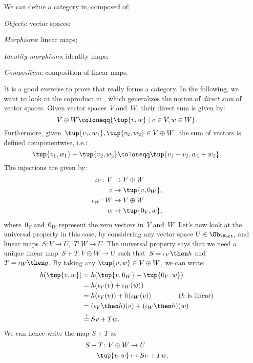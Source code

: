 \begin{example}
We can define a category \Vect in, composed of: 
\begin{compactitem}
\item \emph{Objects}: vector spaces;
\item \emph{Morphisms}: linear maps;
\item \emph{Identity morphisms}: identity maps;
\item \emph{Composition}: composition of linear maps.
\end{compactitem}
It is a good exercise to prove that \Vect really forms a category. In the following, we want to look at the coproduct in \Vect, which generalizes the notion of \emph{direct sum} of vector spaces. Given vector spaces~$V$ and~$W$, their direct sum is given by:
\begin{equation*}
    V\oplus W\coloneqq \{\tup{v,w}\mid v\in V,w\in W\}.
\end{equation*}
Furthermore, given~$\tup{v_1,w_1},\tup{v_2,w_2}\in V\oplus W$, the sum of vectors is defined componentwise, i.e.:
\begin{equation*}
    \tup{v_1,w_1}+\tup{v_2,w_2}\coloneqq \tup{v_1+v_2,w_1+w_2}.
\end{equation*}
The injections are given by:
\begin{equation*}
    \begin{aligned}
    \iota_V\colon V&\to V\oplus W\\
    v&\mapsto \tup{v,0_W},\\
    \iota_W\colon W&\to V\oplus W\\
    w&\mapsto \tup{0_V,w},
    \end{aligned}
\end{equation*}
where~$0_V$ and~$0_W$ represent the zero vectors in~$V$ and~$W$. Let's now look at the universal property in this case, by considering any vector space $U\in \Ob_\Vect$, and linear maps~$S\colon V\to U$,~$T\colon W\to U$. The universal property says that we need a unique linear map~$S+T\colon V\oplus W \to U$ such that~$S=\iota_V\then h$ and~$T=\iota_W\then g$. By taking any $\tup{v,w}\in V\oplus W$, we can write:
\begin{equation*}
    \begin{aligned}
    h(\tup{v,w})&=h(\tup{v,0_W}+\tup{0_V,w})\\
    &=h(\iota_V(v)+\iota_W(w)) \\
    &=h(\iota_V(v))+h(\iota_W(v)) \qquad \qquad (h \text{ is linear})\\
    &=(\iota_V\then h)(v)+(\iota_W\then h)(w)\\
    &\overset{!}{=}Sv+Tw.
    \end{aligned}
\end{equation*}
We can hence write the map $S+T$ as
\begin{equation*}
    \begin{aligned}
    S+T\colon V\oplus W&\to U\\
    \tup{v,w}&\mapsto Sv+Tw.
    \end{aligned}
\end{equation*}
\end{example}

